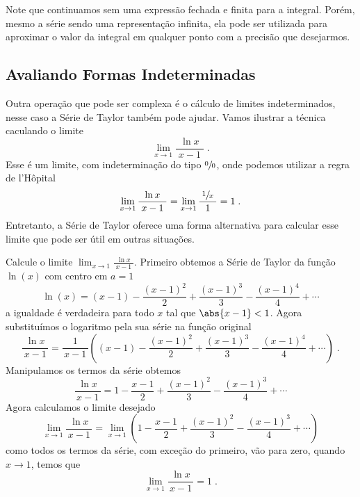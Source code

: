 Note que continuamos sem uma expressão fechada e finita para a integral. Porém,
mesmo a série sendo uma representação infinita, ela pode ser utilizada para aproximar
o valor da integral em qualquer ponto com a precisão que desejarmos.

\subsection{Avaliando Formas Indeterminadas}

Outra operação que pode ser complexa é o cálculo de limites indeterminados,
nesse caso a Série de Taylor também pode ajudar.
Vamos ilustrar a técnica caculando o limite
\[
  \lim_{x\to 1} \frac{\ln x}{\;x-1\;} \;.
\]
Esse é um limite, com indeterminação do tipo $\sfrac{0}{0}$,
onde podemos utilizar a regra de l'Hôpital
\[
  \lim_{x\to 1} \frac{\ln x}{\;x-1\;}
  = \lim_{x\to 1} \frac{\;\sfrac{1}{x}\;}{1}
  = 1 \;.
\]
Entretanto, a Série de Taylor oferece uma forma alternativa
para calcular esse limite que pode ser útil em outras situações.

\begin{example}
  Calcule o limite
  \(
    \lim_{x\to 1} \frac{\ln x}{\;x-1\;}
  \).
  \solution
  Primeiro obtemos a Série de Taylor da função $\ln(x)$ com centro em $a=1$
  \[
    \ln(x) = (x-1) - \frac{(x-1)^2}{2}
    + \frac{(x-1)^3}{3}
    - \frac{(x-1)^4}{4}
    + \cdots
  \]
  a igualdade é verdadeira para todo $x$ tal que $\abs{x-1} < 1$.
  Agora substituímos o logaritmo pela sua série na função original
  \[
    \frac{\ln x}{\,x-1\,}
    = \frac{1}{\,x-1\,}
      \left( (x-1)
        - \frac{(x-1)^2}{2}
        + \frac{(x-1)^3}{3}
        - \frac{(x-1)^4}{4}
        + \cdots
      \right) \;.
  \]
  Manipulamos os termos da série obtemos
  \[
    \frac{\ln x}{\,x-1\,}
    = 1 - \frac{x-1}{2} + \frac{(x-1)^2}{3} - \frac{(x-1)^3}{4} + \cdots
  \]
  Agora calculamos o limite desejado
  \[
    \lim_{x\to 1} \frac{\ln x}{\,x-1\,}
    = \lim_{x\to 1} \left( 1
                      - \frac{x-1}{2}
                      + \frac{(x-1)^2}{3}
                      - \frac{(x-1)^3}{4}
                      + \cdots
                    \right)
  \]
  como todos os termos da série, com exceção do primeiro, vão para zero,
  quando $x\to 1$, temos que
  \[
    \lim_{x\to 1} \frac{\ln x}{\,x-1\,} = 1 \;.
  \]
\end{example}


